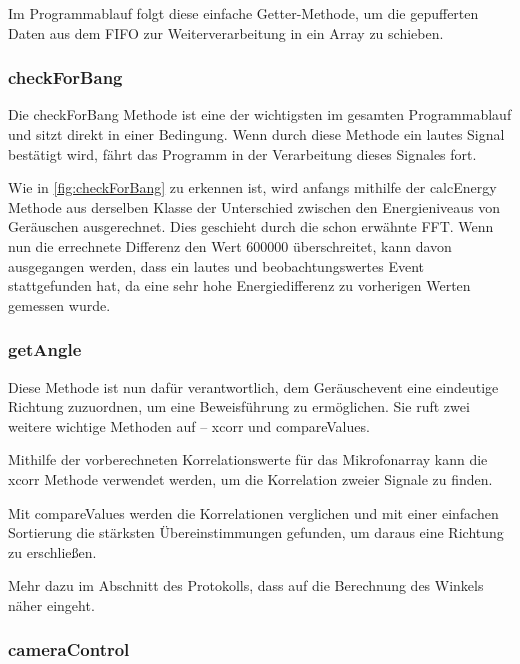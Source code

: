 Im Programmablauf folgt diese einfache Getter-Methode, um die gepufferten Daten aus dem FIFO zur Weiterverarbeitung in ein Array zu schieben.

\subsubsection{checkForBang}

Die checkForBang Methode ist eine der wichtigsten im gesamten Programmablauf und sitzt direkt in einer Bedingung. Wenn durch diese Methode ein lautes Signal bestätigt wird, fährt das Programm in der Verarbeitung dieses Signales fort.

Wie in \autoref{fig:checkForBang} zu erkennen ist, wird anfangs mithilfe der calcEnergy Methode aus derselben Klasse der Unterschied zwischen den Energieniveaus von Geräuschen ausgerechnet. Dies geschieht durch die schon erwähnte FFT. Wenn nun die errechnete Differenz den Wert 600000 überschreitet, kann davon ausgegangen werden, dass ein lautes und beobachtungswertes Event stattgefunden hat, da eine sehr hohe Energiedifferenz zu vorherigen Werten gemessen wurde.



\subsubsection{getAngle}

Diese Methode ist nun dafür verantwortlich, dem Geräuschevent eine eindeutige Richtung zuzuordnen, um eine Beweisführung zu ermöglichen. Sie ruft zwei weitere wichtige Methoden auf – xcorr und compareValues.

Mithilfe der vorberechneten Korrelationswerte für das Mikrofonarray kann die xcorr Methode verwendet werden, um die Korrelation zweier Signale zu finden.

Mit compareValues werden die Korrelationen verglichen und mit einer einfachen Sortierung die stärksten Übereinstimmungen gefunden, um daraus eine Richtung zu erschließen.

Mehr dazu im Abschnitt des Protokolls, dass auf die Berechnung des Winkels näher eingeht.

\subsubsection{cameraControl}

